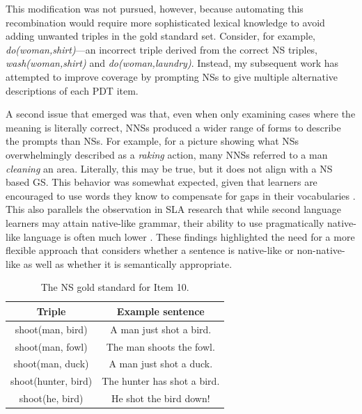 This modification was not pursued, however, because automating this recombination
would require more sophisticated lexical knowledge to avoid adding unwanted
triples in the gold standard set.  Consider, for example,
\textit{do(woman,shirt)}---an incorrect triple derived from the
correct NS triples, \textit{wash(woman,shirt)} and
\textit{do(woman,laundry)}. Instead, my subsequent work has attempted to improve coverage by prompting NSs to give multiple alternative descriptions of each PDT item.

A second issue that emerged was that, even when only examining cases
where the meaning is literally correct, NNSs produced a wider range of
forms to describe the prompts than NSs.  For example, for a picture
showing what NSs overwhelmingly described as a \textit{raking} action,
many NNSs referred to a man \textit{cleaning} an area.  Literally,
this may be true, but it does not align with a NS based GS. 
This behavior was somewhat expected, given that learners are encouraged
to use words they know to compensate for gaps in their vocabularies
\citep{AgustinLlach2010}. This also parallels the observation in SLA research that while second
language learners may attain native-like grammar, their ability to use
pragmatically native-like language is often much lower
\citep{BardoviDornyei1998}. 
These findings highlighted the need for a more flexible approach that considers whether a sentence is native-like or non-native-like as well as whether it is semantically appropriate.

\begin{table}[htb!]
\begin{center}
\begin{tabular}{|c|c|}
\hline
Triple & Example sentence \\
\hline
\hline
shoot(man, bird) & A man just shot a bird. \\
 \hline
shoot(man, fowl) & The man shoots the fowl. \\
 \hline
shoot(man, duck) & A man just shot a duck. \\
 \hline
shoot(hunter, bird) & The hunter has shot a bird. \\
 \hline
shoot(he, bird) & He shot the bird down! \\
 \hline
 \end{tabular}
\end{center}
\caption{The NS gold standard for Item 10.}
\label{tab:item10GS}
\end{table}


